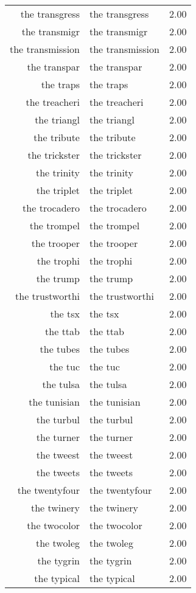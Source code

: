 \begin{table}[ht]
\begin{tabular}{rlr}
  the transgress & the transgress & 2.00 \\ 
  the transmigr & the transmigr & 2.00 \\ 
  the transmission & the transmission & 2.00 \\ 
  the transpar & the transpar & 2.00 \\ 
  the traps & the traps & 2.00 \\ 
  the treacheri & the treacheri & 2.00 \\ 
  the triangl & the triangl & 2.00 \\ 
  the tribute & the tribute & 2.00 \\ 
  the trickster & the trickster & 2.00 \\ 
  the trinity & the trinity & 2.00 \\ 
  the triplet & the triplet & 2.00 \\ 
  the trocadero & the trocadero & 2.00 \\ 
  the trompel & the trompel & 2.00 \\ 
  the trooper & the trooper & 2.00 \\ 
  the trophi & the trophi & 2.00 \\ 
  the trump & the trump & 2.00 \\ 
  the trustworthi & the trustworthi & 2.00 \\ 
  the tsx & the tsx & 2.00 \\ 
  the ttab & the ttab & 2.00 \\ 
  the tubes & the tubes & 2.00 \\ 
  the tuc & the tuc & 2.00 \\ 
  the tulsa & the tulsa & 2.00 \\ 
  the tunisian & the tunisian & 2.00 \\ 
  the turbul & the turbul & 2.00 \\ 
  the turner & the turner & 2.00 \\ 
  the tweest & the tweest & 2.00 \\ 
  the tweets & the tweets & 2.00 \\ 
  the twentyfour & the twentyfour & 2.00 \\ 
  the twinery & the twinery & 2.00 \\ 
  the twocolor & the twocolor & 2.00 \\ 
  the twoleg & the twoleg & 2.00 \\ 
  the tygrin & the tygrin & 2.00 \\ 
  the typical & the typical & 2.00 \\ 

\end{tabular}
\end{table}
